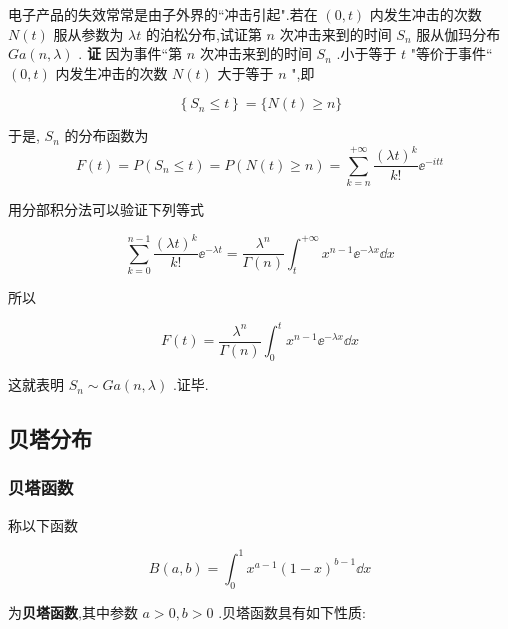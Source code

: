 \begin{example}\label{exam:2.5.6}
	电子产品的失效常常是由子外界的``冲击引起".若在 $ (0,t) $ 内发生冲击的次数 $ N(t) $ 服从参数为 $ \lambda t $ 的泊松分布,试证第 $ n $ 次冲击来到的时间 $ S_{n} $ 服从伽玛分布 $ G a(n, \lambda) $ .
	\textbf{证} 因为事件``第 $ n $ 次冲击来到的时间 $ S_{n} $ .小于等于 $ t $ "等价于事件`` $ (0,t) $ 
	内发生冲击的次数 $ N(t) $ 大于等于 $ n $ ",即
	
	\[
	\left\{S_{n} \leqslant t\right\}=\{N(t) \geqslant n\}
	\]
	
	于是, $ S_{n} $ 的分布函数为
	\[
	F(t)=P\left(S_{n} \leqslant t\right)=P(N(t) \geqslant n)=\sum_{k=n}^{+\infty} \frac{(\lambda t)^{k}}{k !} \ee ^{-i t t}
	\]
	
	用分部积分法可以验证下列等式
	
	\begin{equation}
	\sum_{k=0}^{n-1} \frac{(\lambda t)^{k}}{k !} \ee ^{-\lambda t}=\frac{\lambda^{n}}{\Gamma(n)} \int_{t}^{+\infty} x^{n-1} \ee ^{-\lambda x} \dd x \label{eq:2.5.16}
	\end{equation}
	
	所以
	
	\[
	F(t)=\frac{\lambda^{n}}{\Gamma(n)} \int_{0}^{t} x^{n-1} \ee ^{-\lambda x} \dd x
	\]
	
	这就表明 $ S_{n} \sim G a(n, \lambda) $ .证毕.
\end{example}

\subsection{贝塔分布}\label{ssec:2.5.5}

\subsubsection{贝塔函数}

称以下函数

\begin{equation}
B(a, b)=\int_{0}^{1} x^{a-1}(1-x)^{b-1} \dd x \label{eq:2.5.17}
\end{equation}

为\textbf{贝塔函数},其中参数 $ a>0,b>0 $ .贝塔函数具有如下性质:

